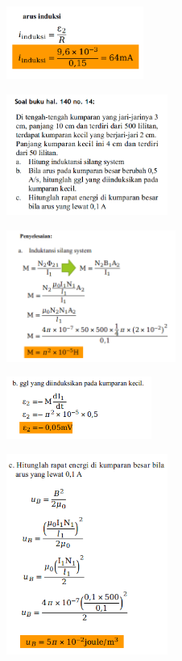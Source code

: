 \documentclass[twocolumn, 11pt]{article}%
\begin{document}
\begin{center}
    \includegraphics[width=170px]{11.png}
\end{center}

\begin{center}
    \includegraphics[width=200px]{12.png}
\end{center}

\begin{center}
    \includegraphics[width=210px]{13.png}
\end{center}

\begin{center}
    \includegraphics[width=180px]{14.png}
\end{center}

\begin{center}
    \includegraphics[width=200px]{15.png}
\end{center}
\end{document}

